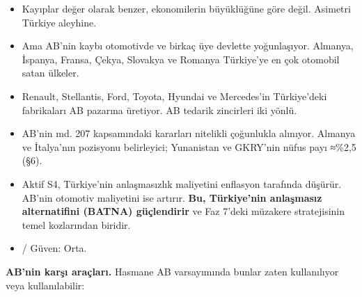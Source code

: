 \begin{itemize}
\tightlist
\item
  Kayıplar değer olarak benzer, ekonomilerin büyüklüğüne göre değil. Asimetri Türkiye aleyhine.
\item
  Ama AB'nin kaybı otomotivde ve birkaç üye devlette yoğunlaşıyor. Almanya, İspanya, Fransa, Çekya, Slovakya ve Romanya Türkiye'ye en çok otomobil satan ülkeler.
\item
  Renault, Stellantis, Ford, Toyota, Hyundai ve Mercedes'in Türkiye'deki fabrikaları AB pazarına üretiyor. AB tedarik zincirleri iki yönlü.
\item
  AB'nin md. 207 kapsamındaki kararları nitelikli çoğunlukla alınıyor. Almanya ve İtalya'nın pozisyonu belirleyici; Yunanistan ve GKRY'nin nüfus payı ≈\%2,5 (§6).
\item
  Aktif S4, Türkiye'nin anlaşmasızlık maliyetini enflasyon tarafında düşürür. AB'nin otomotiv maliyetini ise artırır. \textbf{Bu, Türkiye'nin anlaşmasız alternatifini (BATNA) güçlendirir} ve Faz 7'deki müzakere stratejisinin temel kozlarından biridir.
\item
  \etiketT{}/\etiketH{} Güven: Orta.
\end{itemize}

\textbf{AB'nin karşı araçları.} Hasmane AB varsayımında bunlar zaten kullanılıyor veya kullanılabilir:

\begingroup\gbtablo\small

